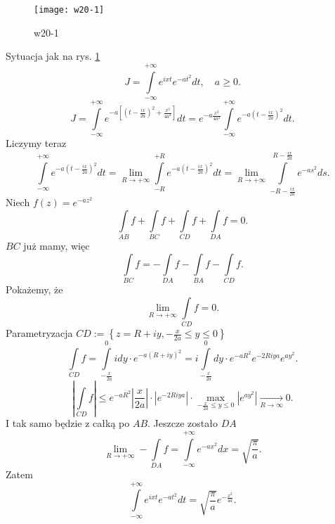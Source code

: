 \documentclass[../main.tex]{subfiles}
\begin{document}
\begin{figure}[h]
    \centering
    \texttt{[image: w20-1]}
    \caption{w20-1}
    \label{fig:w20-1}
\end{figure}
\begin{przyklad}
    Sytuacja jak na rys. \ref{fig:w20-1}
    \[
    J = \int\limits_{-\infty}^{+\infty}e^{ixt}e^{-at^2}dt,\quad a \ge 0
    .\]
\[
    J = \int\limits_{-\infty}^{+\infty}e^{-a\left[ (t - \frac{ix}{2a})^2 + \frac{x^2}{4a^2}\right]}dt = e^{-a\frac{x^2}{4a^2}}\int\limits_{-\infty}^{+\infty}e^{-a(t - \frac{ix}{2a})^2}dt
.\]
Liczymy teraz
\[
    \int\limits_{-\infty}^{+\infty}e^{-a\left( t - \frac{ix}{2a} \right)^2 }dt = \lim\limits_{R\to +\infty}\int\limits_{-R}^{+R}e^{-a\left( t - \frac{ix}{2a} \right) ^2}dt = \lim_{R \to +\infty} \int\limits_{-R - \frac{ix}{2a}}^{R - \frac{ix}{2a}}e^{-as^2}ds
.\]
Niech $f(z) = e^{-az^2}$
 \[
 \int\limits_{AB}f + \int\limits_{BC}f + \int\limits_{CD}f + \int\limits_{DA}f = 0
 .\]
 $BC$ już mamy, więc
    \[
    \int\limits_{BC}f = -\int\limits_{DA}f - \int\limits_{BA}f - \int\limits_{CD}f
    .\]
Pokażemy, że
\[
\lim_{R \to +\infty}\int\limits_{CD}f = 0
.\]
Parametryzacja $CD := \left\{ z = R + iy, -\frac{x}{2a}\le y \le 0 \right\} $
\[
    \int\limits_{CD}f = \int\limits_{-\frac{x}{2a}}^{0}idy\cdot  e^{-a\left( R+iy \right) ^2} = i\int\limits_{-\frac{x}{2a}}^{0}dy\cdot e^{-aR^2}e^{-2Riya}e^{ay^2}
.\]
\[
\left| \int\limits_{CD}f \right| \le e^{-aR^2} \left| \frac{x}{2a} \right| \cdot \left| e^{-2Riya} \right| \cdot \underset{-\frac{x}{2a}\le y \le 0}{\max}  \left| e^{ay^2} \right| \underset{R\to \infty}{\longrightarrow} 0
.\]
I tak samo będzie z całką po $AB$. Jeszcze zostało $DA$
\[
\lim_{R \to +\infty}-\int\limits_{DA}f = \int\limits_{-\infty}^{+\infty}e^{-ax^2}dx = \sqrt{\frac{\pi}{a}}
.\]
Zatem
\[
\int\limits_{-\infty}^{+\infty}e^{ixt}e^{-at^2}dt = \sqrt{\frac{\pi}{a}} e^{-\frac{x^2}{4a}}
.\]
\end{przyklad}
\end{document}
